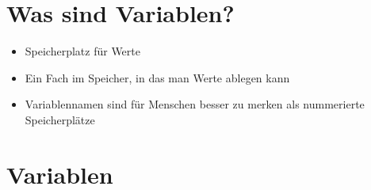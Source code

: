 



\subtitle{Kapitel 3: Daten Zwischenspeichern}
\maketitle

\section{Was sind Variablen?}
\begin{frame}[fragile]
    \slidehead
    \begin{itemize}
        \item Speicherplatz für Werte
            \pause
        \item Ein Fach im Speicher, in das man Werte ablegen kann
            \pause
        \item Variablennamen sind für Menschen besser zu merken als nummerierte Speicherplätze
    \end{itemize}
\end{frame}

\section{Variablen}
